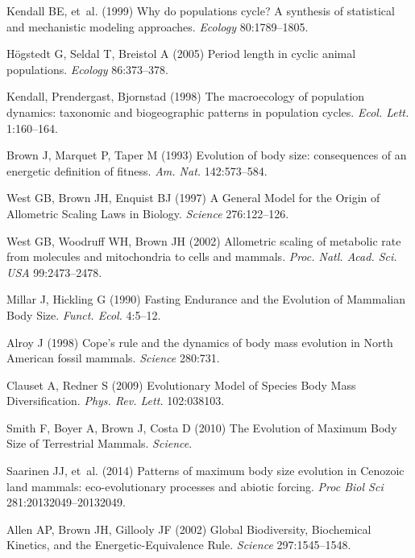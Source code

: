 \documentclass{pnastwo}
\begin{document}
\begin{article}
\begin{thebibliography}{10}
Kendall BE, {et~al.}
\newblock (1999) {Why do populations cycle? A synthesis of statistical and
  mechanistic modeling approaches}.
\newblock \emph{Ecology} 80:1789--1805.

H{\"o}gstedt G, Seldal T, Breistol A
\newblock (2005) {Period length in cyclic animal populations}.
\newblock \emph{Ecology} 86:373--378.

Kendall, Prendergast, Bjornstad
\newblock (1998) {The macroecology of population dynamics: taxonomic and
  biogeographic patterns in population cycles}.
\newblock \emph{Ecol. Lett.} 1:160--164.

Brown J, Marquet P, Taper M
\newblock (1993) {Evolution of body size: consequences of an energetic
  definition of fitness}.
\newblock \emph{Am. Nat.} 142:573--584.

West GB, Brown JH, Enquist BJ
\newblock (1997) {A General Model for the Origin of Allometric Scaling Laws in
  Biology}.
\newblock \emph{Science} 276:122--126.

West GB, Woodruff WH, Brown JH
\newblock (2002) {Allometric scaling of metabolic rate from molecules and
  mitochondria to cells and mammals}.
\newblock \emph{Proc. Natl. Acad. Sci. USA} 99:2473--2478.

Millar J, Hickling G
\newblock (1990) { Fasting Endurance and the Evolution of Mammalian Body Size}.
\newblock \emph{Funct. Ecol.} 4:5--12.

Alroy J
\newblock (1998) {Cope's rule and the dynamics of body mass evolution in North
  American fossil mammals}.
\newblock \emph{Science} 280:731.

Clauset A, Redner S
\newblock (2009) {Evolutionary Model of Species Body Mass Diversification}.
\newblock \emph{Phys. Rev. Lett.} 102:038103.

Smith F, Boyer A, Brown J, Costa D
\newblock (2010) {The Evolution of Maximum Body Size of Terrestrial Mammals}.
\newblock \emph{Science}.

Saarinen JJ, {et~al.}
\newblock (2014) {Patterns of maximum body size evolution in Cenozoic land
  mammals: eco-evolutionary processes and abiotic forcing}.
\newblock \emph{Proc Biol Sci} 281:20132049--20132049.

Allen AP, Brown JH, Gillooly JF
\newblock (2002) {Global Biodiversity, Biochemical Kinetics, and the
  Energetic-Equivalence Rule}.
\newblock \emph{Science} 297:1545--1548.


\end{thebibliography}
\end{article}
\end{document}
